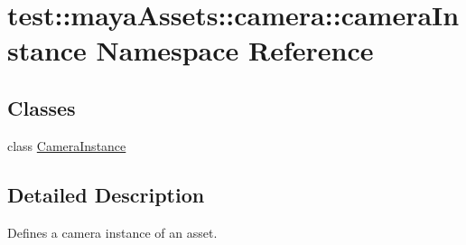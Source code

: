 \hypertarget{namespacetest_1_1mayaAssets_1_1camera_1_1cameraInstance}{\section{test\-:\-:maya\-Assets\-:\-:camera\-:\-:camera\-Instance \-Namespace \-Reference}
\label{d0/dd3/namespacetest_1_1mayaAssets_1_1camera_1_1cameraInstance}
}
\subsection*{\-Classes}
\begin{DoxyCompactItemize}
\item 
class \hyperlink{classtest_1_1mayaAssets_1_1camera_1_1cameraInstance_1_1CameraInstance}{\-Camera\-Instance}
\end{DoxyCompactItemize}


\subsection{\-Detailed \-Description}
\begin{DoxyVerb}
Defines a camera instance of an asset.
\end{DoxyVerb}
 